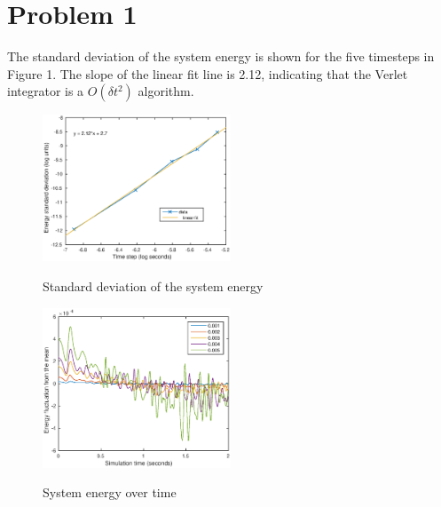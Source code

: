 \documentclass[a4paper,11pt]{article}
\numberwithin{equation}{section}
\begin{document}
\section{Problem 1}
The standard deviation of the system energy is shown for the five timesteps in Figure 1. 
The slope of the linear fit line is 2.12, indicating that the Verlet integrator is a $O(\delta t^2)$ algorithm. 

\begin{figure}[h]
 \caption{Standard deviation of the system energy}
 \centering
   \includegraphics[width=0.5\textwidth]{EnergyStd}
 \label{fig:energystd}
\end{figure}

\begin{figure}[h]
 \caption{System energy over time}
 \centering
   \includegraphics[width=0.5\textwidth]{EnergyPlot}
 \label{fig:energyplot}
\end{figure}
\end{document}

